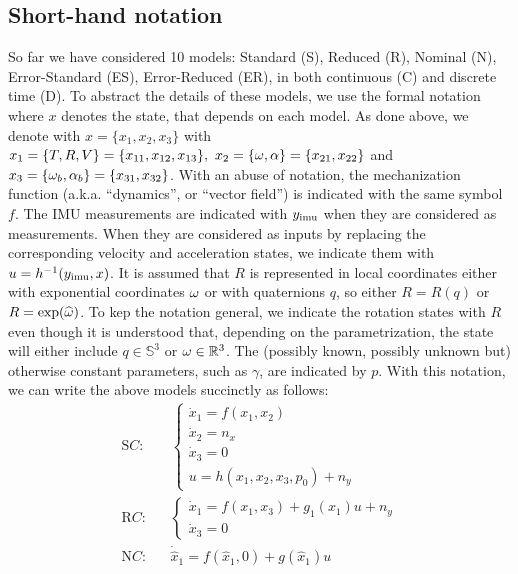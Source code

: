{\subsection{Short-hand notation}
%
So far we have considered 10 models: Standard (S), Reduced (R), Nominal (N), Error-Standard (ES), Error-Reduced (ER), in both continuous (C) and discrete time (D). To abstract the details of these models, we use the formal notation where $x$ denotes the state, that depends on each model. As done above, we denote with $x = \{x_1, x_2, x_3\}$ with $x_1 = \{T, R, V\} = \{x_{11}, x_{12}, x_{13}\}, \ 
x_2 = \{\w, \alpha\} = \{x_{21}, x_{22}\}$ and $x_3 = \{\omega_b, \alpha_b\} =  \{x_{31}, x_{32}\}$.  With an abuse of notation, the mechanization function (a.k.a. ``dynamics'', or ``vector field'') is indicated with the same symbol $f$. The IMU measurements are indicated with $y_\mathrm{imu} $ when they are considered as measurements. When they are considered as inputs by replacing the corresponding velocity and acceleration states, we indicate them with $u = h^{-1}(y_\mathrm{imu} ,x)$. It is assumed that $R$ is represented in local coordinates either with exponential coordinates $\omega$ or with quaternions $q$, so either $R = R(q)$ or $R = \exp(\widehat {\omega})$. To kep the notation general, we indicate the rotation states with $R$ even though it is understood that, depending on the parametrization, the state will either include $q \in {\mathbb S}^3$ or $\omega \in \mathbb{R}^3$. The (possibly known, possibly unknown but) otherwise constant parameters, such as $\gamma$, are indicated by $p$. 
With this notation, we can write the above models succinctly as follows:
\begin{eqnarray}
{\mathrm SC:} && 
\begin{cases}
\dot x_1  = f(x_1, x_2)  \\
\dot x_2 = n_x \\
\dot x_3 = 0 \\
u = h(x_1,x_2, x_3,p_0) + n_y
\end{cases}
\nonumber\\
{\mathrm RC:} && 
\begin{cases}
\dot x_1  = f(x_1, x_3) + g_1(x_1) u +   n_y\\
\dot x_3 = 0
\end{cases}\nonumber\\
{\mathrm NC:} && %
\dot{\hat x}_1 = f(\hat x_1,0) + g(\hat x_1) u   %
\nonumber\\

\end{eqnarray}}
